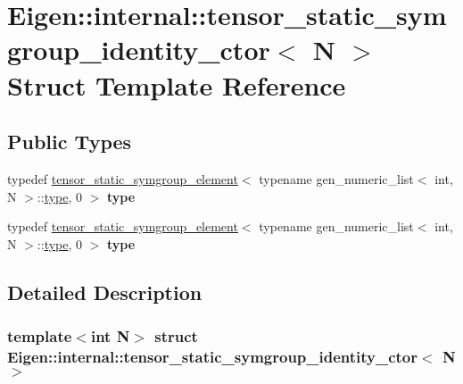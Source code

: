 \hypertarget{struct_eigen_1_1internal_1_1tensor__static__symgroup__identity__ctor}{}\section{Eigen\+:\+:internal\+:\+:tensor\+\_\+static\+\_\+symgroup\+\_\+identity\+\_\+ctor$<$ N $>$ Struct Template Reference}
\label{struct_eigen_1_1internal_1_1tensor__static__symgroup__identity__ctor}
\subsection*{Public Types}
\begin{DoxyCompactItemize}
\item 
\mbox{\label{struct_eigen_1_1internal_1_1tensor__static__symgroup__identity__ctor_a2d7f1f3830dd95ee61f7caa7e2a68e1d}} 
typedef \hyperlink{struct_eigen_1_1internal_1_1tensor__static__symgroup__element}{tensor\+\_\+static\+\_\+symgroup\+\_\+element}$<$ typename gen\+\_\+numeric\+\_\+list$<$ int, N $>$\+::\hyperlink{struct_eigen_1_1internal_1_1tensor__static__symgroup__element}{type}, 0 $>$ {\bfseries type}
\item 
\mbox{\label{struct_eigen_1_1internal_1_1tensor__static__symgroup__identity__ctor_a2d7f1f3830dd95ee61f7caa7e2a68e1d}} 
typedef \hyperlink{struct_eigen_1_1internal_1_1tensor__static__symgroup__element}{tensor\+\_\+static\+\_\+symgroup\+\_\+element}$<$ typename gen\+\_\+numeric\+\_\+list$<$ int, N $>$\+::\hyperlink{struct_eigen_1_1internal_1_1tensor__static__symgroup__element}{type}, 0 $>$ {\bfseries type}
\end{DoxyCompactItemize}


\subsection{Detailed Description}
\subsubsection*{template$<$int N$>$\newline
struct Eigen\+::internal\+::tensor\+\_\+static\+\_\+symgroup\+\_\+identity\+\_\+ctor$<$ N $>$}



